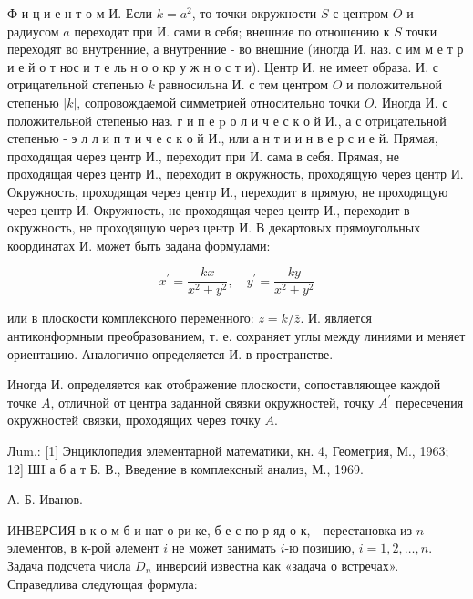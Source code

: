 \documentclass[10pt]{article}
\begin{document}
Ф и ц и е н т о м И. Если $k=a^{2}$, то точки окружности $S$ с центром $O$ и радиусом $a$ переходят при И. сами в себя; внешние по отношению к $S$ точки переходят во внутренние, а внутренние - во внешние (иногда И. наз. с им м е т р и е й о т нос и т е ль н о о кр у ж н о с т и). Центр И. не имеет образа. И. с отрицательной степенью $k$ равносильна И. с тем центром $O$ и положительной степенью $|k|$, сопровождаемой симметрией относительно точки $O$. Иногда И. с положительной степенью наз. г и п е $\mathrm{p}$ о л и ч е с к о й И., а с отрицательной степенью - э л л и п т и ч е с к о й И., или а н т и и н в е р с и е й. Прямая, проходящая через центр И., переходит при И. сама в себя. Прямая, не проходящая через центр И., переходит в окружность, проходящую через центр И. Окружность, проходящая через центр И., переходит в прямую, не проходящую через центр И. Окружность, не проходящая через центр И., переходит в окружность, не проходящую через центр И. В декартовых прямоугольных координатах И. может быть задана формулами:



\[

x^{\prime}=\frac{k x}{x^{2}+y^{2}}, \quad y^{\prime}=\frac{k y}{x^{2}+y^{2}}

\]



или в плоскости комплексного переменного: $z=k / \bar{z}$. И. является антиконформным преобразованием, т. е. сохраняет углы между линиями и меняет ориентацию. Аналогично определяется И. в пространстве.



Иногда И. определяется как отображение плоскости, сопоставляющее каждой точке $A$, отличной от центра заданной связки окружностей, точку $A^{\prime}$ пересечения окружностей связки, проходящих через точку $A$.



Лum.: [1] Энциклопедия элементарной математики, кн. 4, Геометрия, М., 1963; 12] ШI а б а т Б. В., Введение в комплексный анализ, М., 1969.



А. Б. Иванов.



ИНВЕРСИЯ в к о м б и нат о ри ке, б е с по р яд о к, - перестановка из $n$ элементов, в к-рой әлемент $i$ не может занимать $i$-ю позицию, $i=1,2, \ldots, n$. Задача подсчета числа $D_{n}$ инверсий известна как «задача о встречах». Справедлива следующая формула:
\end{document}
